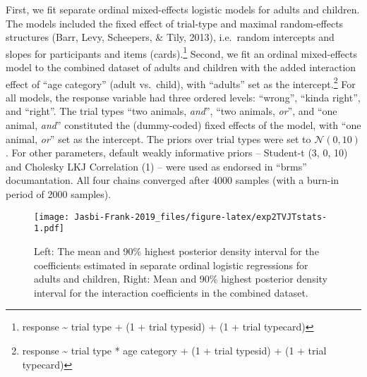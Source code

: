 \documentclass[,man,floatsintext]{apa6}
\let\rmarkdownfootnote\footnote%
\def\footnote{\protect\rmarkdownfootnote}
\begin{document}
First, we fit separate ordinal mixed-effects logistic models for adults and children. The models included the fixed effect of trial-type and maximal random-effects structures (Barr, Levy, Scheepers, \& Tily, 2013), i.e.~random intercepts and slopes for participants and items (cards).\footnote{response \textasciitilde{} trial type + (1 + trial type\textbar{}sid) + (1 + trial type\textbar{}card)} Second, we fit an ordinal mixed-effects model to the combined dataset of adults and children with the added interaction effect of \enquote{age category} (adult vs.~child), with \enquote{adults} set as the intercept.\footnote{response \textasciitilde{} trial type * age category + (1 + trial type\textbar{}sid) + (1 + trial type\textbar{}card)} For all models, the response variable had three ordered levels: \enquote{wrong}, \enquote{kinda right}, and \enquote{right}. The trial types \enquote{two animals, \emph{and}}, \enquote{two animals, \emph{or}}, and \enquote{one animal, \emph{and}} constituted the (dummy-coded) fixed effects of the model, with \enquote{one animal, \emph{or}} set as the intercept. The priors over trial types were set to \(\mathcal{N}(0,10)\). For other parameters, default weakly informative priors -- Student-t (3, 0, 10) and Cholesky LKJ Correlation (1) -- were used as endorsed in \enquote{brms} documantation. All four chains converged after 4000 samples (with a burn-in period of 2000 samples).

\begin{figure}
\centering
\texttt{[image: Jasbi-Frank-2019\_files/figure-latex/exp2TVJTstats-1.pdf]}
\caption{\label{fig:exp2TVJTstats}Left: The mean and 90\% highest posterior density interval for the coefficients estimated in separate ordinal logistic regressions for adults and children, Right: Mean and 90\% highest posterior density interval for the interaction coefficients in the combined dataset.}
\end{figure}
\end{document}
